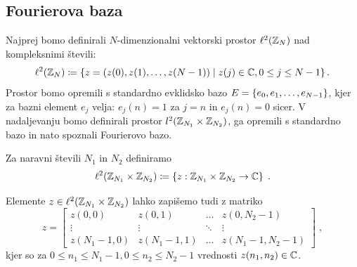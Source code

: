\subsection{Fourierova baza}
%
Najprej bomo definirali $N$-dimenzionalni vektorski prostor $\ell^2(\mathbb Z_N)$ nad kompleksnimi šte\-vi\-li:
$$\ell^2(\mathbb Z_N) \coloneqq \left\{z = (z(0), z(1), \ldots, z(N-1)) \mid z(j) \in \mathbb C, 0 \leq j \leq N-1\right\}.$$
Prostor bomo opremili s standardno evklidsko bazo $E = \left\{e_0, e_1, \ldots, e_{N-1}\right\}$, kjer za bazni element $e_j$ velja: $e_j(n) = 1$ za $j=n$ in $e_j(n) = 0$ sicer. V nadaljevanju bomo definirali prostor $l^2(\mathbb Z_{N_1} \times \mathbb Z_{N_2})$, ga opremili s standardno bazo in nato spoznali Fourierovo bazo.
%
\begin{definicija}
  Za naravni števili $N_1$ in $N_2$ definiramo
  $$\ell^2(\mathbb Z_{N_1} \times \mathbb Z_{N_2}) \coloneqq \left\{z : \mathbb Z_{N_1} \times \mathbb Z_{N_2} \to \mathbb C\right\}\;.$$
\end{definicija}
%
Elemente $z \in \ell^2(\mathbb Z_{N_1} \times \mathbb Z_{N_2})$ lahko zapišemo tudi z matriko
%
\begin{equation*}
  z =
    \begin{bmatrix}
      z(0, 0) & z(0, 1) & \hdots & z(0, N_2-1)\\
      \vdots & \vdots & \ddots & \vdots\\
      z(N_1-1, 0) & z(N_1-1, 1) & \hdots & z(N_1-1, N_2-1)
    \end{bmatrix}\;,
\end{equation*}
%
kjer so za $0 \leq n_1 \leq N_1-1, 0 \leq n_2 \leq N_2-1$ vrednosti $z(n_1, n_2) \in \mathbb C$.


